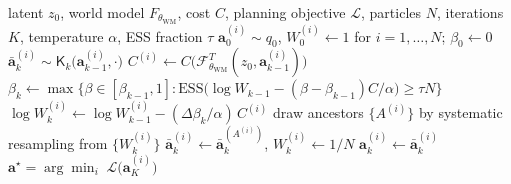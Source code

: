 \begin{algorithm}[t]
\caption{Latent-space planning as an SMC sampler}
\label{alg:smc}
\begin{algorithmic}[1]
\Require latent $z_0$, world model $F_{\theta_{\mathrm{WM}}}$, cost $C$,
         planning objective $\mathcal{L}$, particles $N$, iterations $K$,
         temperature $\alpha$, ESS fraction $\tau$
\State $\mathbf{a}_0^{(i)}\sim q_0$, \; $W_0^{(i)}\leftarrow 1$ \quad for $i=1,\ldots,N$;
       \; $\beta_0\leftarrow 0$
  \State $\bar{\mathbf{a}}_k^{(i)}\sim\mathsf{K}_k\big(\mathbf{a}_{k-1}^{(i)},\cdot\big)$
  \State $C^{(i)}\leftarrow C\big(\mathcal{F}^T_{\theta_{\mathrm{WM}}}(z_0,\mathbf{a}_{k-1}^{(i)})\big)$
  \State $\beta_k\leftarrow\max\big\{\beta\in[\beta_{k-1},1]:
         \text{ESS}\big(\log W_{k-1}-(\beta-\beta_{k-1})C/\alpha\big)\geq\tau N\big\}$
  \State $\log W_k^{(i)}\leftarrow\log W_{k-1}^{(i)}-(\Delta\beta_k/\alpha)\,C^{(i)}$
    \State draw ancestors $\{A^{(i)}\}$ by systematic resampling from $\{W_k^{(i)}\}$
    \State $\bar{\mathbf{a}}_k^{(i)}\leftarrow\bar{\mathbf{a}}_k^{(A^{(i)})}$, \;
           $W_k^{(i)}\leftarrow 1/N$
  \EndIf
  \State $\mathbf{a}_k^{(i)}\leftarrow\bar{\mathbf{a}}_k^{(i)}$
\EndFor
\State \Return $\mathbf{a}^\star=\arg\min_{i}\;\mathcal{L}\big(\mathbf{a}_K^{(i)}\big)$
\end{algorithmic}
\end{algorithm}
